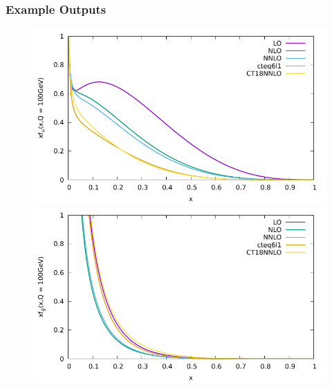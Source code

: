 \documentclass{beamer}
\begin{document}
\begin{frame}
  \frametitle{Example Outputs}

  \begin{figure}
    \centering
    \includegraphics[width=0.51\linewidth]{./gfx/u.pdf}
    \includegraphics[width=0.51\linewidth]{./gfx/g.pdf}
  \end{figure}
\end{frame}
\end{document}

